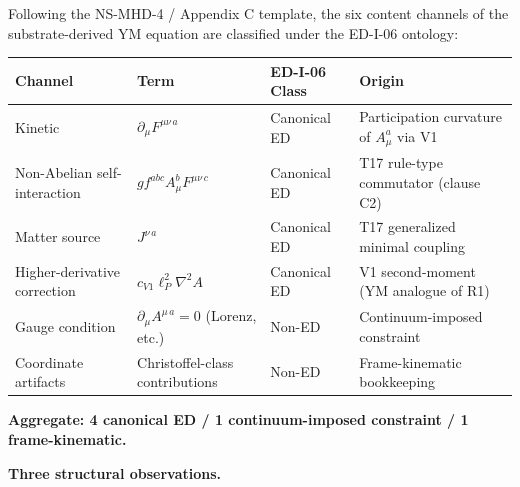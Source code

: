 \documentclass[
]{article}
\newcounter{none} %
\begin{document}
Following the NS-MHD-4 / Appendix C template, the six content channels
of the substrate-derived YM equation are classified under the ED-I-06
ontology:

{\def\LTcaptype{none} %
\begin{longtable}[]{@{}
  >{\raggedright\arraybackslash}p{}
  >{\raggedright\arraybackslash}p{}
  >{\raggedright\arraybackslash}p{}
  >{\raggedright\arraybackslash}p{}@{}}
\toprule\noalign{}
\begin{minipage}[b]{\linewidth}\raggedright
Channel
\end{minipage} & \begin{minipage}[b]{\linewidth}\raggedright
Term
\end{minipage} & \begin{minipage}[b]{\linewidth}\raggedright
ED-I-06 Class
\end{minipage} & \begin{minipage}[b]{\linewidth}\raggedright
Origin
\end{minipage} \\
\midrule\noalign{}
\endhead
\bottomrule\noalign{}
\endlastfoot
Kinetic & \(\partial_\mu F^{\mu\nu\,a}\) & Canonical ED & Participation
curvature of \(A_\mu^a\) via V1 \\
Non-Abelian self-interaction & \(gf^{abc}A_\mu^b F^{\mu\nu\,c}\) &
Canonical ED & T17 rule-type commutator (clause C2) \\
Matter source & \(J^{\nu\,a}\) & Canonical ED & T17 generalized minimal
coupling \\
Higher-derivative correction & \(c_{V1}\ell_P^2\nabla^2 A\) & Canonical
ED & V1 second-moment (YM analogue of R1) \\
Gauge condition & \(\partial_\mu A^{\mu\,a} = 0\) (Lorenz, etc.) &
Non-ED & Continuum-imposed constraint \\
Coordinate artifacts & Christoffel-class contributions & Non-ED &
Frame-kinematic bookkeeping \\
\end{longtable}
}

\textbf{Aggregate: 4 canonical ED / 1 continuum-imposed constraint / 1
frame-kinematic.}

\textbf{Three structural observations.}
\end{document}
